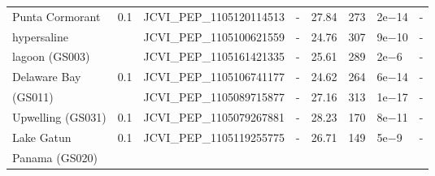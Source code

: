 \begin{table}
\begin{tabularx}{\textwidth}{p{2.5cm}p{0.5cm}p{3.5cm}Xp{0.5cm}p{0.5cm}p{0.8cm}p{0.5cm}}
Punta Cormorant  & 0.1 & JCVI\_PEP\_1105120114513 & - & 27.84 & 273 & 2e$-$14 & - \\
hypersaline &  & JCVI\_PEP\_1105100621559 & - & 24.76 & 307 & 9e$-$10 & - \\
lagoon (GS003) &  & JCVI\_PEP\_1105161421335 & - & 25.61 & 289 & 2e$-$6 & - \\

Delaware Bay & 0.1 & JCVI\_PEP\_1105106741177 & - & 24.62 & 264 & 6e$-$14 & - \\
(GS011)  &  & JCVI\_PEP\_1105089715877 & - & 27.16 & 313 & 1e$-$17 & - \\

Upwelling (GS031) & 0.1 & JCVI\_PEP\_1105079267881 & - & 28.23 & 170 & 8e$-$11 & - \\

Lake Gatun  & 0.1 & JCVI\_PEP\_1105119255775 & - & 26.71 & 149 & 5e$-$9 & - \\
Panama (GS020) &  &  &  &  &  &  &  \\

\bottomrule
\end{tabularx}
\end{table}
\endgroup

